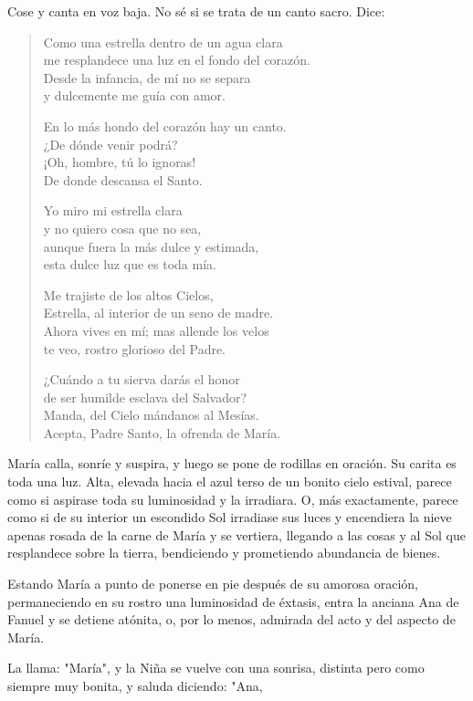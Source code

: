 \documentclass[12pt]{book} %
\begin{document}
Cose y canta en voz baja. No sé si se trata de un canto sacro. Dice:

\begin{verse}
Como una estrella dentro de un agua clara\\
me resplandece una luz en el fondo del corazón.\\
Desde la infancia, de mí no se separa\\
y dulcemente me guía con amor.

En lo más hondo del corazón hay un canto. \\
¿De dónde venir podrá? \\
¡Oh, hombre, tú lo ignoras! \\
De donde descansa el Santo.

Yo miro mi estrella clara\\
y no quiero cosa que no sea,\\
aunque fuera la más dulce y estimada,\\
esta dulce luz que es toda mía. 

Me trajiste de los altos Cielos, \\
Estrella, al interior de un seno de madre.\\
Ahora vives en mí; mas allende los velos\\
te veo, rostro glorioso del Padre.

¿Cuándo a tu sierva darás el honor\\
de ser humilde esclava del Salvador? \\
Manda, del Cielo mándanos al Mesías.\\ 
Acepta, Padre Santo, la ofrenda de María.
\end{verse} 

María calla, sonríe y suspira, y luego se pone de rodillas en oración. Su carita es toda una luz. Alta, elevada hacia el azul terso de un bonito cielo estival, parece como si aspirase toda su luminosidad y la irradiara. O, más exactamente, parece como si de su interior un escondido Sol irradiase sus luces y encendiera la nieve apenas rosada de la carne de María y se vertiera, llegando a las cosas y al Sol que resplandece sobre la tierra, bendiciendo y prometiendo abundancia de bienes. 

Estando María a punto de ponerse en pie después de su amorosa oración, permaneciendo en su rostro una luminosidad de éxtasis, entra la anciana Ana de Fanuel y se detiene atónita, o, por lo menos, admirada del acto y del aspecto de María. 

La llama: "María", y la Niña se vuelve con una sonrisa, distinta pero como siempre muy bonita, y saluda diciendo: "Ana, 
\end{document}
